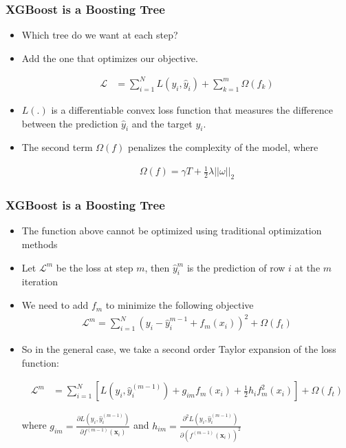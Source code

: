 \documentclass[
  shownotes,
  xcolor={svgnames},
  hyperref={colorlinks,citecolor=DarkBlue,linkcolor=DarkRed,urlcolor=DarkBlue}
  , aspectratio=169]{beamer}
\begin{document}
\begin{frame}[fragile]
\frametitle{XGBoost is a Boosting Tree }

\begin{itemize}


\item Which tree do we want at each step? 
\item Add the one that optimizes our objective.

\begin{align}
\mathcal{L} &= \sum_{i=1}^N L(y_i,\hat{y}_i) + \sum_{k=1}^m \Omega(f_k)
\end{align}

\item  $L(.)$ is a differentiable convex loss function that measures the difference between the prediction $\hat{y}_i$ and the target $y_i$. 
\item  The second term $\Omega(f)$ penalizes the complexity of the model, where


\begin{align}
\Omega(f)=\gamma T + \frac{1}{2}\lambda ||\omega||_2
\end{align}


\end{itemize}
 \end{frame}
\begin{frame}[fragile]
\frametitle{XGBoost is a Boosting Tree }

\begin{itemize}
\item The function above cannot be optimized using traditional optimization methods
\item Let $\mathcal{L}^m$ be the loss at step $m$, then $\hat{y}_i^m$ is the prediction of row $i$ at the $m$ iteration
\item We need to add $f_m$ to minimize the following objective
  \begin{align}
\mathcal{L}^m=\sum_{i=1}^N (y_i-\hat{y}_i^{m-1} + f_m(x_i))^2  +  \Omega(f_t)
\end{align}

\item  So in the general case, we take a second order  Taylor expansion of the loss function:

\begin{align}
\mathcal{L}^m &= \sum_{i=1}^N \left[ L(y_i,\hat{y}_i^{(m-1)}) + g_{im} f_m(x_i) + \frac{1}{2}h_i f^2_m(x_i) \right] +  \Omega(f_t)
\end{align}

where  $g_{im} = \frac{\partial L(y_i,\hat{y}_i^{(m-1)})}{\partial f^{(m-1)}(\mathbf{x}_i)}$ and $h_{im} = \frac{\partial^2 L(y_i,\hat{y}_i^{(m-1)})}{\partial (f^{(m-1)}(\mathbf{x}_i))^2}$
  \end{itemize}
 \end{frame}
\end{document}

